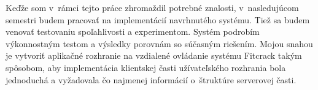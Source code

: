 \documentclass[slovak]{fitthesis}
\begin{document}
Keďže som v~rámci tejto práce zhromaždil potrebné znalosti, v~nasledujúcom semestri budem pracovať na implementácií navrhnutého systému. Tiež sa budem venovať testovaniu spoľahlivosti a experimentom. Systém podrobím výkonnostným testom a výsledky porovnám so súčasným riešením. 
Mojou snahou je vytvoriť aplikačné rozhranie na vzdialené ovládanie systému Fitcrack takým spôsobom, aby implementácia klientskej časti užívateľského rozhrania bola jednoduchá a vyžadovala čo najmenej informácií o~štruktúre serverovej časti. 






\ifslovak
  \makeatletter
  \def\@openbib@code{\addcontentsline{toc}{chapter}{Literatúra}}
  \makeatother
  
\else
  \ifczech
    \makeatletter
    \def\@openbib@code{\addcontentsline{toc}{chapter}{Literatura}}
    \makeatother
    
  \else 
    \makeatletter
    \def\@openbib@code{\addcontentsline{toc}{chapter}{Bibliography}}
    \makeatother
    
  \fi
\fi
  \begin{flushleft}
  
  \end{flushleft}

  \iftwoside
    \cleardoublepage
  \fi

  \appendix
\ifczech
  \renewcommand{\appendixpagename}{Přílohy}
  \renewcommand{\appendixtocname}{Přílohy}
  \renewcommand{\appendixname}{Příloha}
\fi
\ifslovak
  \renewcommand{\appendixpagename}{Prílohy}
  \renewcommand{\appendixtocname}{Prílohy}
  \renewcommand{\appendixname}{Príloha}
\fi

  
\ifslovak
\else
  \ifczech
  \else
  \fi
\fi
  \startcontents[chapters]
  \setlength{\parskip}{0pt}
  
\end{document}
